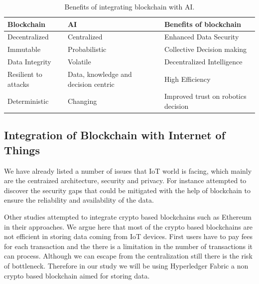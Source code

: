 \begin{table}[hbt!]

    
    \begin{tabular}{  p{4.4cm}  p{4.4cm}  p{5.4cm} }
      
\textbf{Blockchain}      
& \textbf{AI}   
& \textbf{Benefits of blockchain} \\\midrule
Decentralized & Centralized        
& Enhanced Data Security \\\hline

Immutable & Probabilistic       
& Collective Decision making \\\hline


Data Integrity & Volatile      
& Decentralized Intelligence \\\hline

Resilient to attacks & Data, knowledge and decision centric     
& High Efficiency \\\hline

Deterministic  &
Changing      
& Improved trust on robotics decision \\
        \bottomrule
    \end{tabular}
    \caption{Benefits of integrating blockchain with AI.}
    \label{crouch}
\end{table}

\subsection{Integration of Blockchain with Internet of Things}

We have already listed a number of issues that IoT world is facing, which mainly are the centraized architecture, security and privacy. For instance \cite{inbook223ris} attempted to discover the security gaps that could be mitigated with the help of blockchain to ensure the reliability and availability of the data.

Other studies \cite{8598784} attempted to integrate crypto based blockchains such as Ethereum in their approaches. We argue here that most of the crypto based blockchains are not efficient in storing data coming from IoT devices. First users have to pay fees for each transaction and the there is a limitation in the number of transactions it can process. Although we can escape from the centralization still there is the risk of bottleneck. Therefore in our study we will be using Hyperledger Fabric a non crypto based blockchain aimed for storing data. 

































